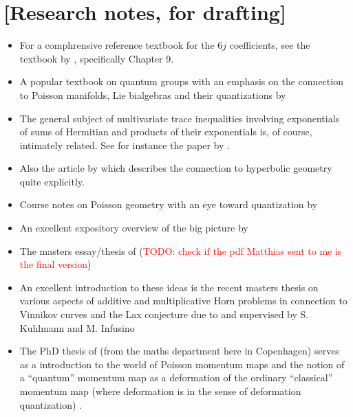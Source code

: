 \documentclass[notitlepage, 10pt]{article}
\begin{document}
\clearpage
\section{[Research notes, for drafting]}

\begin{itemize}
    \item For a comphrensive reference textbook for the $6j$ coefficients, see the textbook by \citeauthor{varshalovich1988quantum} \cite{varshalovich1988quantum}, specifically Chapter 9.
    \item A popular textbook on quantum groups with an emphasis on the connection to Poisson manifolds, Lie bialgebras and their quantizations by \citeauthor{chari1995guide} \cite{chari1995guide}
    \item The general subject of multivariate trace inequalities involving exponentials of sums of Hermitian and products of their exponentials is, of course, intimately related. See for instance the paper by \citeauthor{sutter2017multivariate} \cite{sutter2017multivariate}.
    \item Also the article \cite{forrester2014golden} by \citeauthor{forrester2014golden} which describes the connection to hyperbolic geometry quite explicitly.
    \item Course notes on Poisson geometry with an eye toward quantization by \citeauthor{ciccoli2006poisson} \cite{ciccoli2006poisson}
    \item An excellent expository overview of the big picture by \citeauthor{knutson2000symplectic} \cite{knutson2000symplectic}
    \item The masters essay/thesis of \citeauthor{backens2010sixjsymbols} (\textcolor{red}{TODO: check if the pdf Matthias sent to me is the final version}) \cite{backens2010sixjsymbols}
    \item An excellent introduction to these ideas is the recent masters thesis on various aspects of additive and multiplicative Horn problems in connection to Vinnikov curves and the Lax conjecture due to \citeauthor{hess2020examination} and supervised by S. Kuhlmann and M. Infusino \cite{hess2020examination}
    \item The PhD thesis of \citeauthor{esposito2012classical} (from the maths department here in Copenhagen) serves as a introduction to the world of Poisson momentum maps and the notion of a ``quantum'' momentum map as a deformation of the ordinary ``classical'' momentum map (where deformation is in the sense of deformation quantization) \cite{esposito2012classical}.

\end{itemize}
\end{document}
